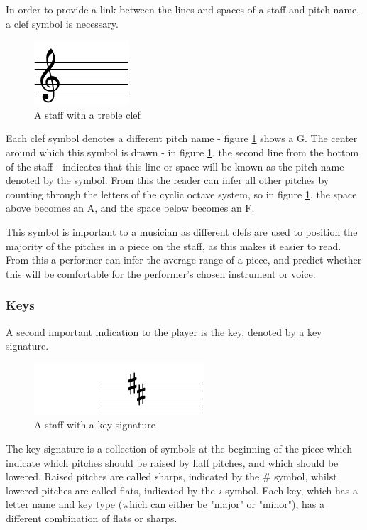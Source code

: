 In order to provide a link between the lines and spaces of a staff and pitch name, a clef symbol is necessary.
\begin{figure}[h]
    \centering
        \includegraphics{clef-crop.pdf}
    \caption{A staff with a treble clef}
    \label{fig:clef}
\end{figure}

Each clef symbol denotes a different pitch name - figure \ref{fig:clef} shows a G. The center around which this symbol is drawn - in figure \ref{fig:clef}, the second line from the bottom of the staff - indicates that this line or space will be known as the pitch name denoted by the symbol. From this the reader can infer all other pitches by counting through the letters of the cyclic octave system, so in figure \ref{fig:clef}, the space above becomes an A, and the space below becomes an F.

This symbol is important to a musician as different clefs are used to position the majority of the pitches in a piece on the staff, as this makes it easier to read. From this a performer can infer the average range of a piece, and predict whether this will be comfortable for the performer's chosen instrument or voice.

\subsubsection{Keys}
A second important indication to the player is the key, denoted by a key signature.
\begin{figure}[h]
    \centering
        \includegraphics{key-crop.pdf}
    \caption{A staff with a key signature}
    \label{fig:key}
\end{figure}

The key signature is a collection of symbols at the beginning of the piece which indicate which pitches should be raised by half pitches, and which should be lowered. Raised pitches are called sharps, indicated by the \# symbol, whilst lowered pitches are called flats, indicated by the $\flat$ symbol. Each key, which has a letter name and key type (which can either be "major" or "minor"), has a different combination of flats or sharps. 

